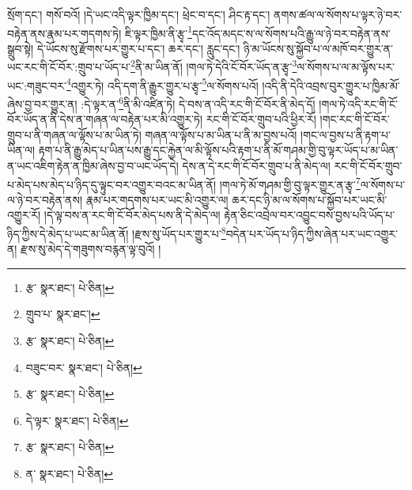 སྲོག་དང་། གསོ་བའོ། །དེ་ཡང་འདི་ལྟར་ཁྱིམ་དང་། ཕྲེང་བ་དང་། ཤིང་རྟ་དང་། ནགས་ཚལ་ལ་སོགས་པ་ལྟར་ཉེ་བར་བརྟེན་ནས་རྣམ་པར་གདགས་ཏེ། ཇི་ལྟར་ཁྱིམ་ནི་རྩྭ་\footnote{རྩ་  སྣར་ཐང་།  པེ་ཅིན། }དང་འོད་མདང་ས་ལ་སོགས་པའི་རྒྱུ་ལ་ཉེ་བར་བརྟེན་ནས་སྒྲུབ་སྟེ། དེ་ཡོངས་སུ་རྫོགས་པར་གྱུར་པ་དང་། ཆར་དང་། རླུང་དང་། ཉི་མ་ཡོངས་སུ་སྐྱོབ་པ་ལ་མཁོ་བར་གྱུར་ན་ཡང་རང་གི་ངོ་བོར་:གྲུབ་པ་ཡོད་པ་\footnote{གྲུབ་པ་  སྣར་ཐང་། }ནི་མ་ཡིན་ནོ། །གལ་ཏེ་དེའི་ངོ་བོར་ཡོད་ན་རྩྭ་\footnote{རྩ་  སྣར་ཐང་།  པེ་ཅིན། }ལ་སོགས་པ་ལ་མ་ལྟོས་པར་ཡང་:གཟུང་བར་\footnote{བཟུང་བར་  སྣར་ཐང་།  པེ་ཅིན། }འགྱུར་ཏེ། འདི་དག་ནི་རྒྱུར་གྱུར་པ་རྩྭ་\footnote{རྩ་  སྣར་ཐང་།  པེ་ཅིན། }ལ་སོགས་པའོ། །འདི་ནི་དེའི་འབྲས་བུར་གྱུར་པ་ཁྱིམ་མོ་ཞེས་བྱ་བར་གྱུར་ན། :དེ་ལྟར་ན་\footnote{དེ་ལྟར་  སྣར་ཐང་།  པེ་ཅིན། }ནི་མི་འཛིན་ཏེ། དེ་བས་ན་འདི་རང་གི་ངོ་བོར་ནི་མེད་དོ། །གལ་ཏེ་འདི་རང་གི་ངོ་བོར་ཡོད་ན་ནི་དེས་ན་གཞན་ལ་བརྟེན་པར་མི་འགྱུར་ཏེ། རང་གི་ངོ་བོར་གྲུབ་པའི་ཕྱིར་རོ། །གང་རང་གི་ངོ་བོར་གྲུབ་པ་ནི་གཞན་ལ་ལྟོས་པ་མ་ཡིན་ཏེ། གཞན་ལ་ལྟོས་པ་མ་ཡིན་པ་ནི་མ་བྱས་པའོ། །གང་ལ་བྱས་པ་ནི་རྟག་པ་ཡིན་ལ། རྟག་པ་ནི་རྒྱུ་མེད་པ་ཡིན་པས་རྒྱུ་དང་རྐྱེན་ལ་མི་ལྟོས་པའི་རྟག་པ་ནི་མོ་གཤམ་གྱི་བུ་ལྟར་ཡོད་པ་མ་ཡིན་ན་ཡང་འཇིག་རྟེན་ན་ཁྱིམ་ཞེས་བྱ་བ་ཡང་ཡོད་དེ། དེས་ན་དེ་རང་གི་ངོ་བོར་གྲུབ་པ་ནི་མེད་ལ། རང་གི་ངོ་བོར་གྲུབ་པ་མེད་པས་མེད་པ་ཉིད་དུ་ལྟུང་བར་འགྱུར་བའང་མ་ཡིན་ནོ། །གལ་ཏེ་མོ་གཤམ་གྱི་བུ་ལྟར་གྱུར་ན་རྩྭ་\footnote{རྩ་  སྣར་ཐང་།  པེ་ཅིན། }ལ་སོགས་པ་ལ་ཉེ་བར་བརྟེན་ནས། རྣམ་པར་གདགས་པར་ཡང་མི་འགྱུར་ལ། ཆར་དང་ཉི་མ་ལ་སོགས་པ་སྐྱོབ་པར་ཡང་མི་འགྱུར་རོ། །དེ་ལྟ་བས་ན་རང་གི་ངོ་བོར་མེད་པས་ནི་དེ་མེད་ལ། རྟེན་ཅིང་འབྲེལ་བར་འབྱུང་བས་བྱས་པའི་ཡོད་པ་ཉིད་ཀྱིས་དེ་མེད་པ་ཡང་མ་ཡིན་ནོ། །རྫས་སུ་ཡོད་པར་གྱུར་པ་\footnote{ན་  སྣར་ཐང་།  པེ་ཅིན། }བདེན་པར་ཡོད་པ་ཉིད་ཀྱིས་ཞེན་པར་ཡང་འགྱུར་ན། རྫས་སུ་མེད་དེ་གཟུགས་བརྙན་ལྟ་བུའོ། །
